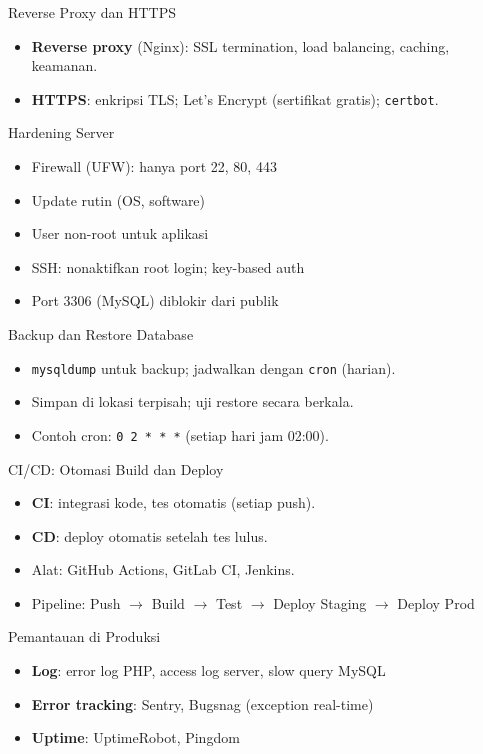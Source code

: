 \documentclass[handout]{beamer}
\begin{document}
\begin{frame}{Reverse Proxy dan HTTPS}
	\begin{itemize}
		\item \textbf{Reverse proxy} (Nginx): SSL termination, load balancing, caching, keamanan.
		\item \textbf{HTTPS}: enkripsi TLS; Let's Encrypt (sertifikat gratis); \texttt{certbot}.
	\end{itemize}
\end{frame}

\begin{frame}{Hardening Server}
	\begin{itemize}
		\item Firewall (UFW): hanya port 22, 80, 443
		\item Update rutin (OS, software)
		\item User non-root untuk aplikasi
		\item SSH: nonaktifkan root login; key-based auth
		\item Port 3306 (MySQL) diblokir dari publik
	\end{itemize}
\end{frame}

\begin{frame}{Backup dan Restore Database}
	\begin{itemize}
		\item \texttt{mysqldump} untuk backup; jadwalkan dengan \texttt{cron} (harian).
		\item Simpan di lokasi terpisah; uji restore secara berkala.
		\item Contoh cron: \texttt{0 2 * * *} (setiap hari jam 02:00).
	\end{itemize}
\end{frame}

\begin{frame}{CI/CD: Otomasi Build dan Deploy}
	\begin{itemize}
		\item \textbf{CI}: integrasi kode, tes otomatis (setiap push).
		\item \textbf{CD}: deploy otomatis setelah tes lulus.
		\item Alat: GitHub Actions, GitLab CI, Jenkins.
		\item Pipeline: Push $\to$ Build $\to$ Test $\to$ Deploy Staging $\to$ Deploy Prod
	\end{itemize}
\end{frame}

\begin{frame}{Pemantauan di Produksi}
	\begin{itemize}
		\item \textbf{Log}: error log PHP, access log server, slow query MySQL
		\item \textbf{Error tracking}: Sentry, Bugsnag (exception real-time)
		\item \textbf{Uptime}: UptimeRobot, Pingdom
	\end{itemize}
\end{frame}
\end{document}
